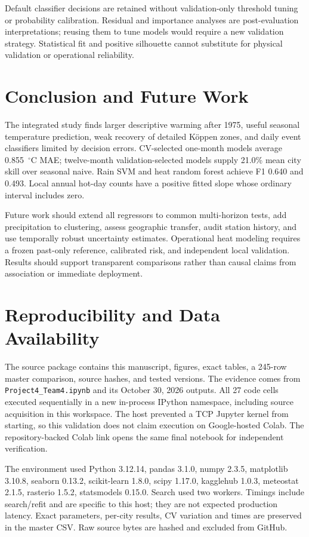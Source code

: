 \documentclass[conference]{IEEEtran}
\begin{document}
Default classifier decisions are retained without validation-only threshold tuning or probability calibration. Residual and importance analyses are post-evaluation interpretations; reusing them to tune models would require a new validation strategy. Statistical fit and positive silhouette cannot substitute for physical validation or operational reliability.

\section{Conclusion and Future Work}
The integrated study finds larger descriptive warming after 1975, useful seasonal temperature prediction, weak recovery of detailed K\"oppen zones, and daily event classifiers limited by decision errors. CV-selected one-month models average 0.855~$^\circ$C MAE; twelve-month validation-selected models supply 21.0\% mean city skill over seasonal naive. Rain SVM and heat random forest achieve F1 0.640 and 0.493. Local annual hot-day counts have a positive fitted slope whose ordinary interval includes zero.

Future work should extend all regressors to common multi-horizon tests, add precipitation to clustering, assess geographic transfer, audit station history, and use temporally robust uncertainty estimates. Operational heat modeling requires a frozen past-only reference, calibrated risk, and independent local validation. Results should support transparent comparisons rather than causal claims from association or immediate deployment.

\section*{Reproducibility and Data Availability}
The source package contains this manuscript, figures, exact tables, a 245-row master comparison, source hashes, and tested versions. The evidence comes from \texttt{Project4\_Team4.ipynb} and its October 30, 2026 outputs. All 27 code cells executed sequentially in a new in-process IPython namespace, including source acquisition in this workspace. The host prevented a TCP Jupyter kernel from starting, so this validation does not claim execution on Google-hosted Colab. The repository-backed Colab link opens the same final notebook for independent verification.

The environment used Python 3.12.14, pandas 3.1.0, numpy 2.3.5, matplotlib 3.10.8, seaborn 0.13.2, scikit-learn 1.8.0, scipy 1.17.0, kagglehub 1.0.3, meteostat 2.1.5, rasterio 1.5.2, statsmodels 0.15.0. Search used two workers. Timings include search/refit and are specific to this host; they are not expected production latency. Exact parameters, per-city results, CV variation and times are preserved in the master CSV. Raw source bytes are hashed and excluded from GitHub.
\end{document}
